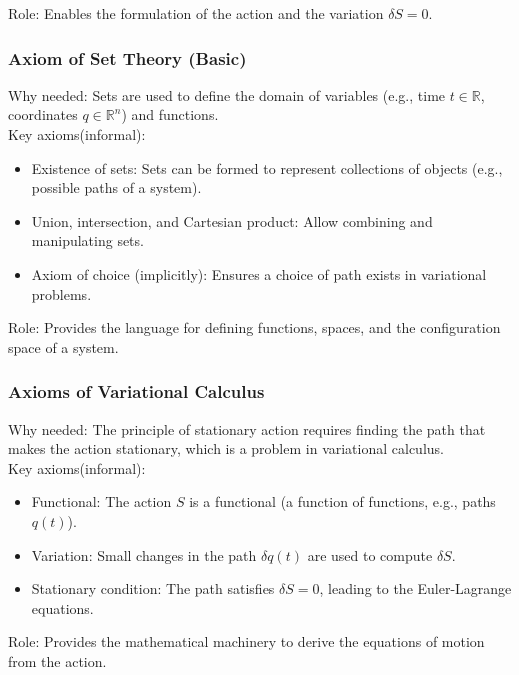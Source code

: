 Role: Enables the formulation of the action and the variation $ \delta S = 0 $.

\subsubsection{Axiom of Set Theory (Basic)}
Why needed: Sets are used to define the domain of variables (e.g., time $ t \in \mathbb{R} $, coordinates $ q \in \mathbb{R}^n $) and functions.
\\
Key axioms(informal):
\begin{itemize}
    \item Existence of sets: Sets can be formed to represent collections of objects (e.g., possible paths of a system).
    \item Union, intersection, and Cartesian product: Allow combining and manipulating sets.
    \item Axiom of choice (implicitly): Ensures a choice of path exists in variational problems.

\end{itemize}

Role: Provides the language for defining functions, spaces, and the configuration space of a system.

\subsubsection{Axioms of Variational Calculus}
Why needed: The principle of stationary action requires finding the path that makes the action stationary, which is a problem in variational calculus.
\\
Key axioms(informal):
\begin{itemize}
    \item Functional: The action $ S $ is a functional (a function of functions, e.g., paths $ q(t) $).
    \item Variation: Small changes in the path $ \delta q(t) $ are used to compute $ \delta S $.
    \item Stationary condition: The path satisfies $ \delta S = 0 $, leading to the Euler-Lagrange equations.

\end{itemize}

Role: Provides the mathematical machinery to derive the equations of motion from the action.

